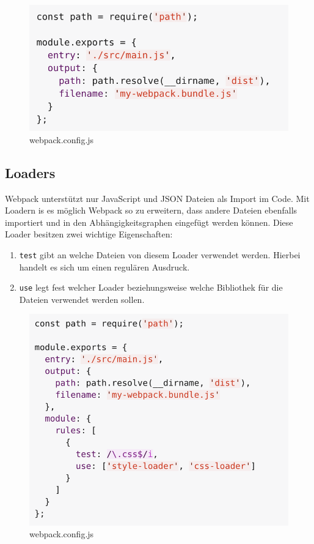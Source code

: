 \begin{figure}[H]
	\begin{center}
		\includegraphics[scale=.7]{images/webpack-output.png}
	\end{center}
		\caption{webpack.config.js}
\end{figure}

\subsection{Loaders}
Webpack unterstützt nur JavaScript und JSON Dateien als Import im Code. Mit Loadern is es möglich Webpack so zu erweitern, dass andere Dateien ebenfalls importiert und in den Abhängigkeitsgraphen eingefügt werden können. Diese Loader besitzen zwei wichtige Eigenschaften:

\begin{enumerate}
	\item \texttt{test} gibt an welche Dateien von diesem Loader verwendet werden. Hierbei handelt es sich um einen 
		regulären Ausdruck.
	\item \texttt{use} legt fest welcher Loader beziehungsweise welche Bibliothek für die Dateien verwendet werden sollen.
\end{enumerate}

\begin{figure}[H]
	\begin{center}
		\includegraphics[scale=.7]{images/webpack-loaders.png}
	\end{center}
		\caption{webpack.config.js}
\end{figure}

